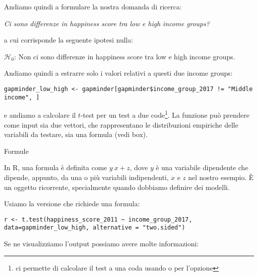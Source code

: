\noindent Andiamo quindi a formulare la nostra domanda di ricerca: 

\vspace{0.2cm}

\centerline{\emph{Ci sono differenze in happiness score tra low e high income groups?}} 

\vspace{0.2cm}

\noindent a cui corrisponde la seguente ipotesi nulla: 

\vspace{0.2cm}

\noindent $\mathcal{H}_0$: Non ci sono differenze in happiness score tra low e high income groups.

\vspace{0.2cm}

\noindent Andiamo quindi a estrarre solo i valori relativi a questi due income groups:

\begin{lstlisting}[style=Rstylescript]
gapminder_low_high <- gapminder[gapminder$income_group_2017 != "Middle income", ]
\end{lstlisting}
%
e andiamo a calcolare il $t$-test per un test a due code\footnote{ ci permette di calcolare il test a una coda usando  o  per l'opzione }. La funzione  pu\`o prendere come input sia due vettori, che rappresentano le distribuzioni empiriche delle variabili da testare, sia una formula (vedi box). 


\begin{mybox}{Formule}

In R, una formula \`e definita come $y ~ x + z$, dove $y$ \`e una variabile dipendente che dipende, appunto, da una o pi\`u variabili indipendenti, $x$ e $z$ nel nostro esempio. \`E un oggetto ricorrente, specialmente quando dobbiamo definire dei modelli. 

\end{mybox}


\noindent Usiamo la versione che richiede una formula:

\begin{lstlisting}[style=Rstylescript]
r <- t.test(happiness_score_2011 ~ income_group_2017, data=gapminder_low_high, alternative = "two.sided")
\end{lstlisting}
%
Se ne visualizziamo l'output possiamo avere molte informazioni:

